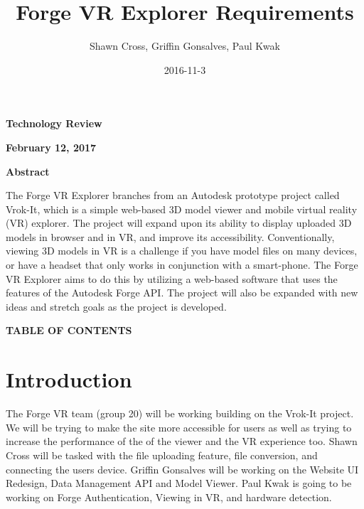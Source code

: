 \documentclass[letterpaper, 10pt, draftclsnofoot, compsoc, onecolumn]{IEEEtran}
\title{Forge VR Explorer Requirements}
\author{Shawn Cross, Griffin Gonsalves, Paul Kwak}
\date{2016-11-3}
\begin{document}
\clearpage\setcounter{page}{1}\pagestyle{Standard}
\thispagestyle{FirstPage}

\bigskip

{\centering{}\bfseries\color{black}
Technology Review
\par}


\bigskip

{\centering{}\bfseries\color{black}
February 12, 2017
\par}
\bigskip
\bigskip
\bigskip
\bigskip
\bigskip
\bigskip
\bigskip
\bigskip
\bigskip
\bigskip
\bigskip
\bigskip


\vfill
{\centering{}\bfseries\color{black}
Abstract
\par}

{\centering{}\mdseries\color{black}
	The Forge VR Explorer branches from an Autodesk prototype project called Vrok-It, which is a simple web-based 3D 
	model viewer and mobile virtual reality (VR) explorer. The project will expand upon its ability to display uploaded 3D 
	models in browser and in VR, and improve its accessibility. Conventionally, viewing 3D models in VR is a challenge if 
	you have model files on many devices, or have a headset that only works in conjunction with a smart-phone. The 
	Forge VR Explorer aims to do this by utilizing a web-based software that uses the features of the Autodesk Forge API. 
	The project will also be expanded with new ideas and stretch goals as the project is developed.
\par}
\clearpage
{\centering{}\bfseries\color{black}
TABLE OF CONTENTS
\par}

\bigskip

\setcounter{tocdepth}{9}
\renewcommand\contentsname{}
\tableofcontents

\bigskip
\clearpage


\section{Introduction}
	The Forge VR team (group 20) will be working building on the Vrok-It project. We will be trying to make the site more accessible for users
	as well as trying to increase the performance of the  of the viewer and the VR experience too. Shawn Cross will be tasked with the file
	uploading feature, file conversion, and connecting the users device. Griffin Gonsalves will be working on the Website UI Redesign, Data Management API
	and Model Viewer. Paul Kwak is going to be working on Forge Authentication, Viewing in VR, and hardware detection.
	
\end{document}
